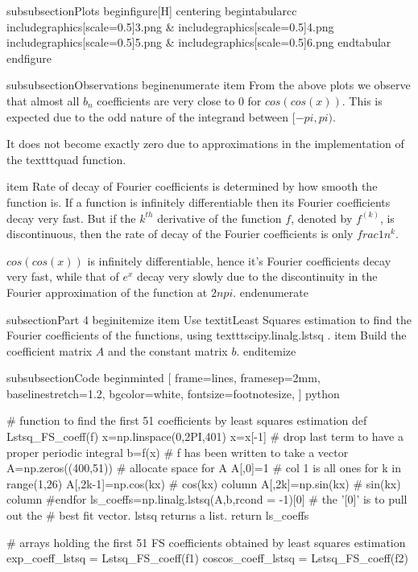 subsubsection{Plots}
begin{figure}[H]
    centering
    begin{tabular}{cc}
        includegraphics[scale=0.5]{3.png} &                includegraphics[scale=0.5]{4.png}
        includegraphics[scale=0.5]{5.png} &                includegraphics[scale=0.5]{6.png}
    end{tabular}
end{figure}

subsubsection{Observations}
begin{enumerate}
    item From the above plots we observe that almost all $b_n$ coefficients are very close to 0 for $cos(cos(x))$. This is expected due to the odd nature of the integrand between $[-pi,pi)$.

    It does not become exactly zero due to approximations in the implementation of the texttt{quad} function.

    item Rate of decay of Fourier coefficients is determined by how smooth the  function is. If a function is infinitely differentiable then its Fourier coefficients decay very fast. But if the $k^{th}$ derivative of the function $f$, denoted by $f^{(k)}$, is discontinuous, then the rate of decay of the Fourier coefficients is only $frac{1}{n^k}$.

    $cos(cos(x))$ is infinitely differentiable, hence it's Fourier coefficients decay very fast, while that of $e^x$ decay very slowly due to the discontinuity in the Fourier approximation of the function at $2npi$.
end{enumerate}

subsection{Part 4}
begin{itemize}
    item Use textit{Least Squares estimation} to find the Fourier coefficients of the functions, using texttt{scipy.linalg.lstsq} .          
    item Build the coefficient matrix $A$ and the constant matrix $b$.
end{itemize}

subsubsection{Code}
begin{minted}
[
frame=lines,
framesep=2mm,
baselinestretch=1.2,
bgcolor=white,
fontsize=footnotesize,
]
{python}

# function to find the first 51 coefficients by least squares estimation
def Lstsq_FS_coeff(f)
    x=np.linspace(0,2PI,401)
    x=x[-1] # drop last term to have a proper periodic integral
    b=f(x) # f has been written to take a vector
    A=np.zeros((400,51)) # allocate space for A
    A[,0]=1 # col 1 is all ones
    for k in range(1,26)
        A[,2k-1]=np.cos(kx) # cos(kx) column
        A[,2k]=np.sin(kx) # sin(kx) column
    #endfor
    ls_coeffs=np.linalg.lstsq(A,b,rcond = -1)[0] # the ’[0]’ is to pull out the
    # best fit vector. lstsq returns a list.
    return ls_coeffs

# arrays holding the first 51 FS coefficients obtained by least squares estimation
exp_coeff_lstsq = Lstsq_FS_coeff(f1)
coscos_coeff_lstsq = Lstsq_FS_coeff(f2)



